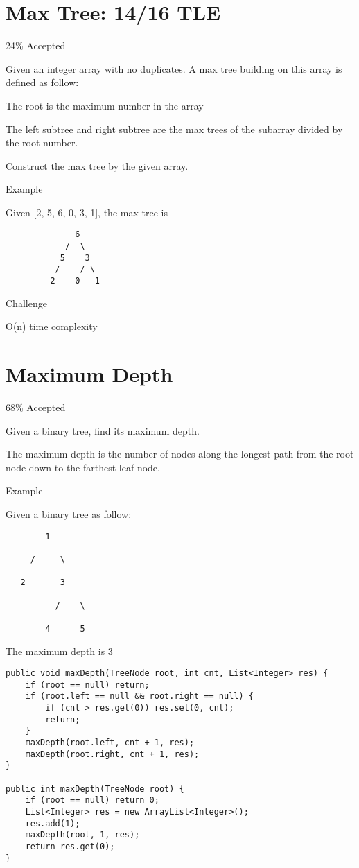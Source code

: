 \documentclass[9pt, b5paaper]{book}
\begin{document}
\section{Max Tree: 14/16 TLE}
\label{sec-5-37}

24\% Accepted

Given an integer array with no duplicates. A max tree building on this array is defined as follow:

The root is the maximum number in the array

The left subtree and right subtree are the max trees of the subarray divided by the root number.

Construct the max tree by the given array.

Example

Given [2, 5, 6, 0, 3, 1], the max tree is
\begin{verbatim}
              6
            /  \
           5    3
          /    / \
         2    0   1
\end{verbatim}
Challenge

O(n) time complexity
\section{Maximum Depth}
\label{sec-5-38}

68\% Accepted

Given a binary tree, find its maximum depth.

The maximum depth is the number of nodes along the longest path from the root node down to the farthest leaf node.

Example

Given a binary tree as follow:
\begin{verbatim}
        1

     /     \ 

   2       3

          /    \

        4      5
\end{verbatim}

The maximum depth is 3
\begin{verbatim}
public void maxDepth(TreeNode root, int cnt, List<Integer> res) {
    if (root == null) return;
    if (root.left == null && root.right == null) {
        if (cnt > res.get(0)) res.set(0, cnt);
        return;
    }
    maxDepth(root.left, cnt + 1, res);
    maxDepth(root.right, cnt + 1, res);
}
        
public int maxDepth(TreeNode root) {
    if (root == null) return 0;
    List<Integer> res = new ArrayList<Integer>();
    res.add(1);
    maxDepth(root, 1, res);
    return res.get(0);
}
\end{verbatim}
\end{document}
